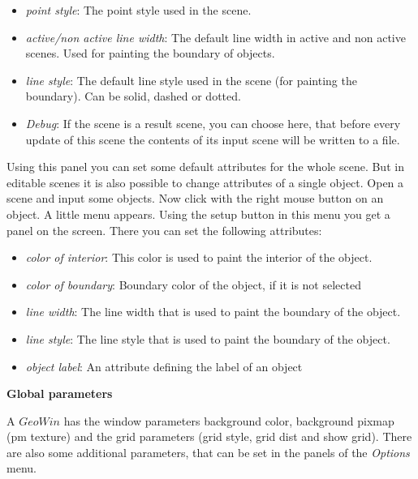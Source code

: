 \begin{itemize}
\item {\em point style}: The point style used in the scene.
                 
\item {\em active/non active line width}: The default line width in active and non active scenes. 
                            Used for painting the boundary of objects.
                
\item {\em line style}: The default line style used in the scene (for painting the boundary). Can be solid, dashed or dotted.
            
\item {\em Debug}: If the scene is a result scene, you can choose here, that before every update
                of this scene the contents of its input scene will be written to a file.
      
\end{itemize}

Using this panel you can set some default attributes for the whole scene. But in editable scenes it is also
possible to change attributes of a single object.
Open a scene and input some objects. Now click with the right mouse button on an object. A little menu appears.
Using the setup button in this menu you get a panel on the screen.
There you can set the following attributes:

\begin{itemize}

\item {\em color of interior}: This color is used to paint the interior of the object.

\item {\em color of boundary}: Boundary color of the object, if it is not selected 

\item {\em line width}: The line width that is used to paint the boundary of the object.

\item {\em line style}: The line style that is used to paint the boundary of the object. 

\item {\em object label}: An attribute defining the label of an object 

\end{itemize}

{\bf Global parameters}

A $GeoWin$ has the window parameters background color, background pixmap (pm texture) and the grid parameters
(grid style, grid dist and show grid).
There are also some additional parameters, that can be set in the panels of the {\em Options} menu.

